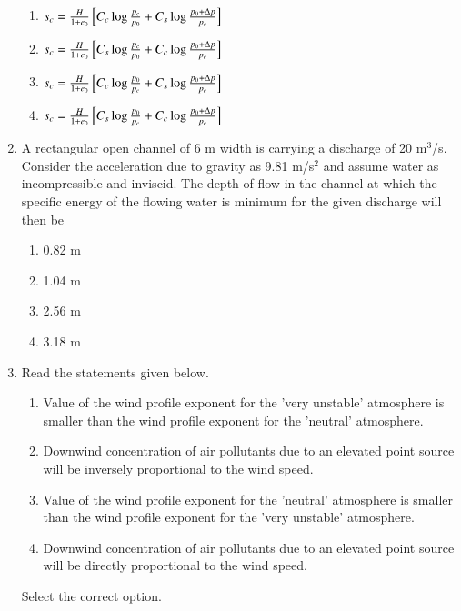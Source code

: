 \documentclass[journal,12pt,onecolumn]{article}
\theoremstyle{remark}
\begin{document}
\begin{enumerate}
\hfill{}

\begin{enumerate}
    \item $s_c = \frac{H}{1+e_0} {}\left[ C_c \log \frac{p_c}{p_0} + C_s \log \frac{p_0+\Delta p}{p_c} \right]$
    \item $s_c = \frac{H}{1+e_0} {}\left[ C_s \log \frac{p_c}{p_0} + C_c \log \frac{p_0+\Delta p}{p_c} \right]$
    \item $s_c = \frac{H}{1+e_0} {}\left[ C_c \log \frac{p_0}{p_c} + C_s \log \frac{p_0+\Delta p}{p_c} \right]$
    \item $s_c = \frac{H}{1+e_0} {}\left[C_s \log \frac{p_0}{p_c} + C_c \log \frac{p_0+\Delta p}{p_c} \right]$
\end{enumerate}

\item A rectangular open channel of 6 m width is carrying a discharge of 20 m$^3$/s. Consider the acceleration due to gravity as 9.81 m/s$^2$ and assume water as incompressible and inviscid. The depth of flow in the channel at which the specific energy of the flowing water is minimum for the given discharge will then be

\hfill{}

\begin{multicols}{2}
\begin{enumerate}
    \item 0.82 m
    \item 1.04 m
    \item 2.56 m
    \item 3.18 m
\end{enumerate}
\end{multicols}

\item Read the statements given below.
\begin{enumerate}
    \item[\brak{i}] Value of the wind profile exponent for the 'very unstable' atmosphere is smaller than the wind profile exponent for the 'neutral' atmosphere.
    \item[\brak{ii}] Downwind concentration of air pollutants due to an elevated point source will be inversely proportional to the wind speed.
    \item[\brak{iii}] Value of the wind profile exponent for the 'neutral' atmosphere is smaller than the wind profile exponent for the 'very unstable' atmosphere.
    \item[\brak{iv}] Downwind concentration of air pollutants due to an elevated point source will be directly proportional to the wind speed.
\end{enumerate}
Select the correct option.


\end{enumerate}
\end{document}
